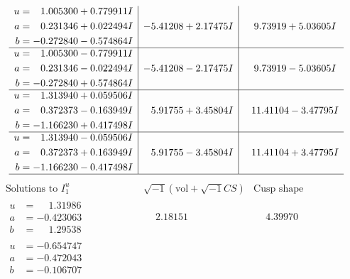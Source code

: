 \documentclass[1p]{elsarticle_modified}
\theoremstyle{definition}
\newcommand{\I}{\sqrt{-1}}
\begin{document}
$$\begin{array}{c|c|c}
\begin{aligned}
u &= \phantom{-}1.005300 + 0.779911 I \\
a &= \phantom{-}0.231346 + 0.022494 I \\
b &= -0.272840 - 0.574864 I\end{aligned}
 & -5.41208 + 2.17475 I & \phantom{-}9.73919 + 5.03605 I \\ \hline\begin{aligned}
u &= \phantom{-}1.005300 - 0.779911 I \\
a &= \phantom{-}0.231346 - 0.022494 I \\
b &= -0.272840 + 0.574864 I\end{aligned}
 & -5.41208 - 2.17475 I & \phantom{-}9.73919 - 5.03605 I \\ \hline\begin{aligned}
u &= \phantom{-}1.313940 + 0.059506 I \\
a &= \phantom{-}0.372373 - 0.163949 I \\
b &= -1.166230 + 0.417498 I\end{aligned}
 & \phantom{-}5.91755 + 3.45804 I & \phantom{-}11.41104 - 3.47795 I \\ \hline\begin{aligned}
u &= \phantom{-}1.313940 - 0.059506 I \\
a &= \phantom{-}0.372373 + 0.163949 I \\
b &= -1.166230 - 0.417498 I\end{aligned}
 & \phantom{-}5.91755 - 3.45804 I & \phantom{-}11.41104 + 3.47795 I\\
 \hline 
 \end{array}$$\newpage$$\begin{array}{c|c|c}  
\text{Solutions to }I^u_{1}& \I (\text{vol} + \sqrt{-1}CS) & \text{Cusp shape}\\
 \hline 
\begin{aligned}
u &= \phantom{-}1.31986\phantom{ +0.000000I} \\
a &= -0.423063\phantom{ +0.000000I} \\
b &= \phantom{-}1.29538\phantom{ +0.000000I}\end{aligned}
 & \phantom{-}2.18151\phantom{ +0.000000I} & \phantom{-}4.39970\phantom{ +0.000000I} \\ \hline\begin{aligned}
u &= -0.654747\phantom{ +0.000000I} \\
a &= -0.472043\phantom{ +0.000000I} \\
b &= -0.106707\phantom{ +0.000000I}\end{aligned}

\end{array}$$
\end{document}
